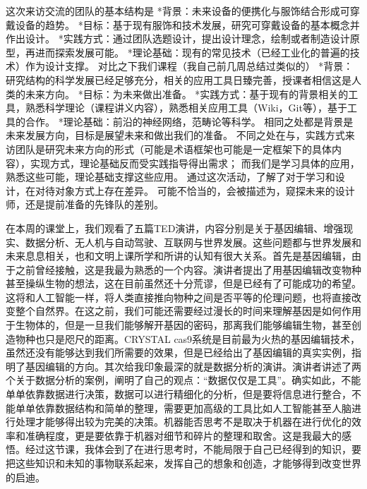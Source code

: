\documentclass[11pt,fleqn]{book}
\numberwithin{dummy}{section}
\theoremstyle{ocrenumbox}
\theoremstyle{blacknumex}
\theoremstyle{blacknumbox}
\theoremstyle{ocrenum}
\newenvironment{remark}[1]{\par\vspace{10pt}\small %
	\begin{list}{}{
			\leftmargin=35pt %
			\rightmargin=25pt}\item\ignorespaces %
		\makebox[-2.5pt]{\begin{tikzpicture}[overlay]
			\node[draw=ocre!60,line width=1pt,circle,fill=ocre!25,font=\sffamily\bfseries,inner sep=2pt,outer sep=0pt] at (-15pt,0pt){\textcolor{ocre}{#1}};\end{tikzpicture}} %
		\advance\baselineskip -1pt}{\end{list}\vskip5pt} %
\newlength\esp
\begin{document}
\begin{remark}{黄}
	这次来访交流的团队的基本结构是
	*背景：未来设备的便携化与服饰结合形成可穿戴设备的趋势。
	*目标：基于现有服饰和技术发展，研究可穿戴设备的基本概念并作出设计。
	*实践方式：通过团队选题设计，提出设计理念，绘制或者制造设计原型，再进而探索发展可能。
	*理论基础：现有的常见技术（已经工业化的普遍的技术）作为设计支撑。
	对比之下我们课程（我自己前几周总结过类似的）
	*背景：研究结构的科学发展已经足够充分，相关的应用工具日臻完善，授课者相信这是人类的未来方向。
	*目标：为未来做出准备。
	*实践方式：基于现有的背景相关的工具，熟悉科学理论（课程讲义内容），熟悉相关应用工具（Wiki，Git等），基于工具的合作。
	*理论基础：前沿的神经网络，范畴论等科学。
	相同之处都是背景是未来发展方向，目标是展望未来和做出我们的准备。
	不同之处在与，实践方式来访团队是研究未来方向的形式（可能是术语框架也可能是一定框架下的具体内容），实现方式，理论基础反而受实践指导得出需求；
	而我们是学习具体的应用，熟悉这些可能，理论基础支撑这些应用。
	通过这次活动，了解了对于学习和设计，在对待对象方式上存在差异。
	可能不恰当的，会被描述为，窥探未来的设计师，还是提前准备的先锋队的差别。
\end{remark}

\begin{remark}{樊}
	在本周的课堂上，我们观看了五篇TED演讲，内容分别是关于基因编辑、增强现实、数据分析、无人机与自动驾驶、互联网与世界发展。这些问题都与世界发展和未来息息相关，也和文明上课所学和所讲的认知有很大关系。首先是基因编辑，由于之前曾经接触，这是我最为熟悉的一个内容。演讲者提出了用基因编辑改变物种甚至操纵生物的想法，这在目前虽然还十分荒谬，但是已经有了可能成功的希望。这将和人工智能一样，将人类直接推向物种之间是否平等的伦理问题，也将直接改变整个自然界。在这之前，我们可能还需要经过漫长的时间来理解基因是如何作用于生物体的，但是一旦我们能够解开基因的密码，那离我们能够编辑生物，甚至创造物种也只是咫尺的距离。CRYSTAL cas9系统是目前最为火热的基因编辑技术，虽然还没有能够达到我们所需要的效果，但是已经给出了基因编辑的真实实例，指明了基因编辑的方向。其次给我印象最深的就是数据分析的演讲。演讲者讲述了两个关于数据分析的案例，阐明了自己的观点：“数据仅仅是工具”。确实如此，不能单单依靠数据进行决策，数据可以进行精细化的分析，但是要将信息进行整合，不能单单依靠数据结构和简单的整理，需要更加高级的工具比如人工智能甚至人脑进行处理才能够得出较为完美的决策。机器能否思考不是取决于机器在进行优化的效率和准确程度，更是要依靠于机器对细节和碎片的整理和取舍。这是我最大的感悟。经过这节课，我体会到了在进行思考时，不能局限于自己已经得到的知识，要把这些知识和未知的事物联系起来，发挥自己的想象和创造，才能够得到改变世界的启迪。
\end{remark}
\end{document}
